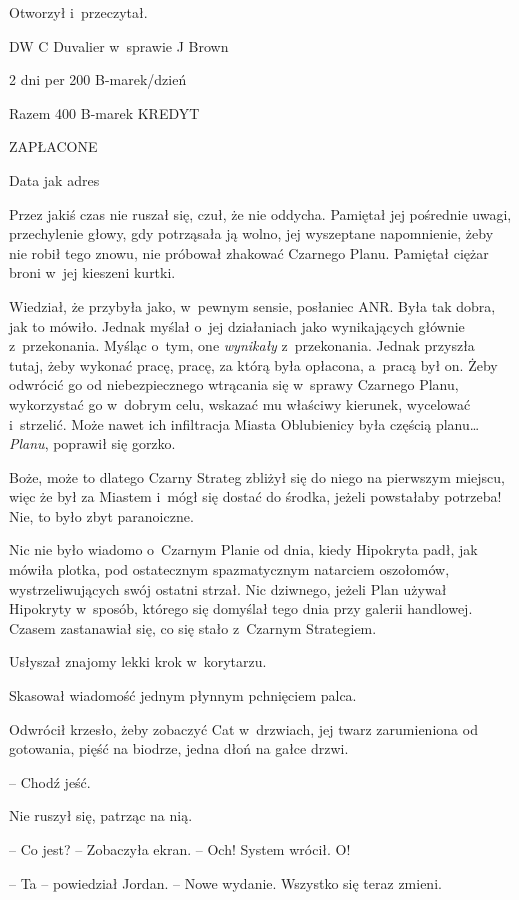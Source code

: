 \documentclass[oneside,polish,11pt,sfheadings]{mwbk}
\begin{document}
Otworzył i~przeczytał.

DW C Duvalier w~sprawie J Brown

2 dni per 200 B-marek/dzień

Razem 400 B-marek KREDYT

ZAPŁACONE

Data jak adres

Przez jakiś czas nie ruszał się, czuł, że nie oddycha. Pamiętał jej
pośrednie uwagi, przechylenie głowy, gdy potrząsała ją wolno, jej
wyszeptane napomnienie, żeby nie robił tego znowu, nie próbował zhakować
Czarnego Planu. Pamiętał ciężar broni w~jej kieszeni kurtki.

Wiedział, że przybyła jako, w~pewnym sensie, posłaniec ANR. Była tak
dobra, jak to mówiło. Jednak myślał o~jej działaniach jako wynikających
głównie z~przekonania. Myśląc o~tym, one \emph{wynikały} z~przekonania.
Jednak przyszła tutaj, żeby wykonać pracę, pracę, za którą była
opłacona, a~pracą był on. Żeby odwrócić go od niebezpiecznego wtrącania
się w~sprawy Czarnego Planu, wykorzystać go w~dobrym celu, wskazać mu
właściwy kierunek, wycelować i~strzelić. Może nawet ich infiltracja
Miasta Oblubienicy była częścią planu\ldots \emph{Planu}, poprawił się
gorzko.

Boże, może to dlatego Czarny Strateg zbliżył się do niego na pierwszym
miejscu, więc że był za Miastem i~mógł się dostać do środka, jeżeli
powstałaby potrzeba! Nie, to było zbyt paranoiczne.

Nic nie było wiadomo o~Czarnym Planie od dnia, kiedy Hipokryta padł, jak
mówiła plotka, pod ostatecznym spazmatycznym natarciem oszołomów,
wystrzeliwujących swój ostatni strzał. Nic dziwnego, jeżeli Plan używał
Hipokryty w~sposób, którego się domyślał tego dnia przy galerii
handlowej. Czasem zastanawiał się, co się stało z~Czarnym Strategiem.

Usłyszał znajomy lekki krok w~korytarzu.

Skasował wiadomość jednym płynnym pchnięciem palca.

Odwrócił krzesło, żeby zobaczyć Cat w~drzwiach, jej twarz zarumieniona
od gotowania, pięść na biodrze, jedna dłoń na gałce drzwi.

-- Chodź jeść.

Nie ruszył się, patrząc na nią.

-- Co jest? -- Zobaczyła ekran. -- Och! System wrócił. O!

-- Ta -- powiedział Jordan. -- Nowe wydanie. Wszystko się teraz zmieni.
\end{document}
